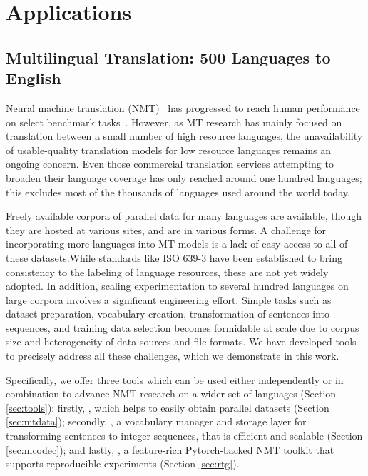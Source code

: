 \chapter{Applications}
\label{ch:applications}

\section{Multilingual Translation: 500 Languages to English}

Neural machine translation (NMT)~\cite{bahdanau2014nmtattn,vaswani2017attention} has progressed to reach human performance on select benchmark tasks~\cite{barrault-etal-2019-findings,barrault-etal-2020-findings}. 
However, as MT research has mainly focused on translation between a small number of high resource languages, the unavailability of usable-quality translation models for low resource languages remains an ongoing concern.
Even those commercial translation services attempting to broaden their language coverage has only reached around one hundred languages; this excludes most of the thousands of languages used around the world today.

Freely available corpora of parallel data for many languages are available, though they are hosted at various sites, and are in various forms. A challenge for incorporating more languages into MT models is a lack of easy access to all of these datasets.While standards like ISO 639-3 have been established to bring consistency to the labeling of language resources, these are not yet widely adopted.
In addition, scaling experimentation to several hundred languages on large corpora involves a significant engineering effort.
Simple tasks such as dataset preparation, vocabulary creation, transformation of sentences into sequences, and training data selection becomes formidable at scale due to corpus size and heterogeneity of data sources and file formats.
We have developed tools to precisely address all these challenges, which we demonstrate in this work.
 
Specifically, we offer three tools which can be used either independently or in combination to advance NMT research on a wider set of languages (Section \ref{sec:tools}): firstly, \mtdata, which helps to easily obtain parallel datasets (Section \ref{sec:mtdata}); secondly, \nlcodec, a vocabulary manager and storage layer for transforming sentences to integer sequences, that is efficient and scalable (Section \ref{sec:nlcodec}); and lastly, \rtg, a feature-rich Pytorch-backed NMT toolkit that supports reproducible experiments (Section \ref{sec:rtg}).

